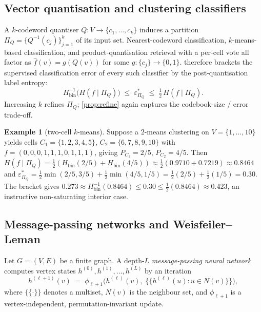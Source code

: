 \documentclass[10pt]{article}
\theoremstyle{definition}
\newtheorem{example}[theorem]{Example}
\theoremstyle{remark}
\newcommand{\Hbin}{H_{\mathrm{bin}}}
\newcommand{\Hinv}{H_{\mathrm{bin}}^{-1}}
\newcommand{\eps}{\varepsilon}
\begin{document}
\subsection{Vector quantisation and clustering classifiers}\label{sec:apps:vq}

A $k$-codeword quantiser $Q : V \to \{c_{1}, \ldots, c_{k}\}$
induces a partition $\Pi_{Q} = \{Q^{-1}(c_{j})\}_{j=1}^{k}$ of
its input set. Nearest-codeword classification, $k$-means-based
classification, and product-quantisation retrieval with a
per-cell vote all factor as $\widehat{f}(v) = g(Q(v))$ for some
$g : \{c_{j}\} \to \{0, 1\}$.  therefore
brackets the supervised classification error of every such
classifier by the post-quantisation label entropy:
\[
  \Hinv\!\bigl(H(f \mid \Pi_{Q})\bigr) \;\le\; \eps^{\!*}_{\Pi_{Q}}
  \;\le\; \tfrac{1}{2}\, H(f \mid \Pi_{Q}).
\]
Increasing $k$ refines $\Pi_{Q}$; \cref{prop:refine} again
captures the codebook-size / error trade-off.

\begin{example}[two-cell $k$-means]\label{ex:vq}
Suppose a $2$-means clustering on $V = \{1, \ldots, 10\}$ yields
cells $C_{1} = \{1, 2, 3, 4, 5\}$, $C_{2} = \{6, 7, 8, 9, 10\}$
with $f = (0, 0, 0, 1, 1, 1, 0, 1, 1, 1)$, giving $P_{C_{1}} = 2/5$,
$P_{C_{2}} = 4/5$. Then
$H(f \mid \Pi_{Q}) = \tfrac{1}{2}(\Hbin(2/5) + \Hbin(4/5)) \approx \tfrac{1}{2}(0.9710 + 0.7219) \approx 0.8464$
and $\eps^{\!*}_{\Pi_{Q}} = \tfrac{1}{2}\min(2/5,3/5) + \tfrac{1}{2}\min(4/5,1/5) = \tfrac{1}{2}(2/5) + \tfrac{1}{2}(1/5) = 0.30$.
The bracket gives $0.273 \approx \Hinv(0.8464) \le 0.30 \le \tfrac{1}{2}(0.8464) \approx 0.423$,
an instructive non-saturating interior case.
\end{example}

\subsection{Message-passing networks and Weisfeiler--Leman}\label{sec:apps:mpnn}

Let $G = (V, E)$ be a finite graph. A depth-$L$
\emph{message-passing neural network} computes vertex states
$h^{(0)}, h^{(1)}, \ldots, h^{(L)}$ by an iteration
\[
  h^{(\ell+1)}(v) \;=\; \phi_{\ell+1}\!\bigl(h^{(\ell)}(v),\; \{\!\{h^{(\ell)}(u) : u \in N(v)\}\!\}\bigr),
\]
where $\{\!\{\cdot\}\!\}$ denotes a multiset, $N(v)$ is the
neighbour set, and $\phi_{\ell+1}$ is a vertex-independent,
permutation-invariant update.
\end{document}
